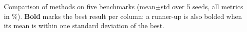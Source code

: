 \caption{Comparison of methods on five benchmarks (mean$\pm$std over 5 seeds, all metrics in \%). \textbf{Bold} marks the best result per column; a runner-up is also bolded when its mean is within one standard deviation of the best.}
